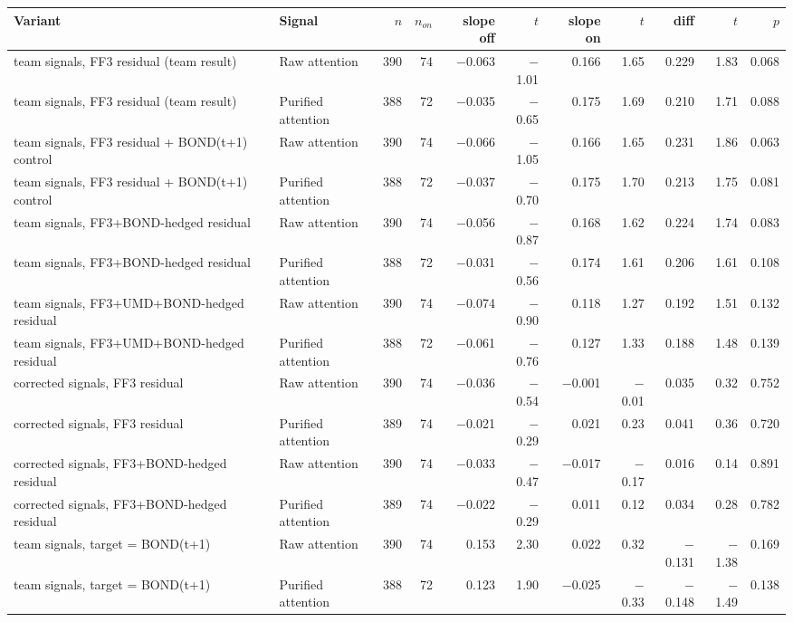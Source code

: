 \begin{tabular}{llrrrrrrrrr}
\toprule
Variant & Signal & $n$ & $n_{on}$ & slope off & $t$ & slope on & $t$ & diff & $t$ & $p$ \\
\midrule
team signals, FF3 residual (team result) & Raw attention & 390 & 74 & $-$0.063 & $-$1.01 & 0.166 & 1.65 & 0.229 & 1.83 & 0.068 \\
team signals, FF3 residual (team result) & Purified attention & 388 & 72 & $-$0.035 & $-$0.65 & 0.175 & 1.69 & 0.210 & 1.71 & 0.088 \\
team signals, FF3 residual + BOND(t+1) control & Raw attention & 390 & 74 & $-$0.066 & $-$1.05 & 0.166 & 1.65 & 0.231 & 1.86 & 0.063 \\
team signals, FF3 residual + BOND(t+1) control & Purified attention & 388 & 72 & $-$0.037 & $-$0.70 & 0.175 & 1.70 & 0.213 & 1.75 & 0.081 \\
team signals, FF3+BOND-hedged residual & Raw attention & 390 & 74 & $-$0.056 & $-$0.87 & 0.168 & 1.62 & 0.224 & 1.74 & 0.083 \\
team signals, FF3+BOND-hedged residual & Purified attention & 388 & 72 & $-$0.031 & $-$0.56 & 0.174 & 1.61 & 0.206 & 1.61 & 0.108 \\
team signals, FF3+UMD+BOND-hedged residual & Raw attention & 390 & 74 & $-$0.074 & $-$0.90 & 0.118 & 1.27 & 0.192 & 1.51 & 0.132 \\
team signals, FF3+UMD+BOND-hedged residual & Purified attention & 388 & 72 & $-$0.061 & $-$0.76 & 0.127 & 1.33 & 0.188 & 1.48 & 0.139 \\
corrected signals, FF3 residual & Raw attention & 390 & 74 & $-$0.036 & $-$0.54 & $-$0.001 & $-$0.01 & 0.035 & 0.32 & 0.752 \\
corrected signals, FF3 residual & Purified attention & 389 & 74 & $-$0.021 & $-$0.29 & 0.021 & 0.23 & 0.041 & 0.36 & 0.720 \\
corrected signals, FF3+BOND-hedged residual & Raw attention & 390 & 74 & $-$0.033 & $-$0.47 & $-$0.017 & $-$0.17 & 0.016 & 0.14 & 0.891 \\
corrected signals, FF3+BOND-hedged residual & Purified attention & 389 & 74 & $-$0.022 & $-$0.29 & 0.011 & 0.12 & 0.034 & 0.28 & 0.782 \\
team signals, target = BOND(t+1) & Raw attention & 390 & 74 & 0.153 & 2.30 & 0.022 & 0.32 & $-$0.131 & $-$1.38 & 0.169 \\
team signals, target = BOND(t+1) & Purified attention & 388 & 72 & 0.123 & 1.90 & $-$0.025 & $-$0.33 & $-$0.148 & $-$1.49 & 0.138 \\

\end{tabular}
